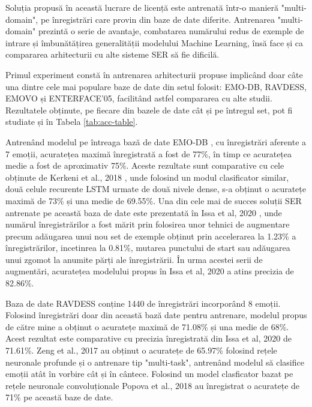 \documentclass[a4paper,12pt]{book}
\begin{document}
		 Soluția propusă în această lucrare de licență este antrenată într-o manieră "multi-domain", pe înregistrări care provin din baze de date diferite. Antrenarea "multi-domain" prezintă o serie de avantaje, combatarea numărului redus de exemple de intrare și îmbunătățirea generalității modelului Machine Learning, însă face și ca compararea arhitecturii cu alte sisteme SER să fie dificilă. \par
		 Primul experiment constă în antrenarea arhitecturii propuse implicând doar câte una dintre cele mai populare baze de date din setul folosit: EMO-DB, RAVDESS, EMOVO și ENTERFACE'05, facilitând astfel compararea cu alte studii. Rezultatele obținute, pe fiecare din bazele de date cât și pe întregul set, pot fi studiate și în Tabela \ref{tab:acc-table}.
		  \par
		 Antrenând modelul pe întreaga bază de date EMO-DB \cite{emodb}, cu înregistrări aferente a 7 emoții, acuratețea maximă înregistrată a fost de 77\%, în timp ce acuratețea medie a fost de aproximativ 75\%. Aceste rezultate sunt comparative cu cele obținute de Kerkeni et al., 2018 \cite{comp1}, unde folosind un modul clasificator similar, două celule recurente LSTM urmate de două nivele dense, s-a obținut o acuratețe maximă de 73\% și una medie de 69.55\%. Una din cele mai de succes soluții SER antrenate pe această baza de date este prezentată în Issa et al, 2020 \cite{comp2}, unde numărul înregistrărilor a fost mărit prin folosirea unor tehnici de augmentare precum adăugarea unui nou set de exemple obținut prin accelerarea la 1.23\% a înregistrărilor, incetinrea la 0.81\%, mutarea punctului de start sau adăugarea unui zgomot la anumite părți ale înregistrării. În urma acestei serii de augmentări, acuratețea modelului propus în Issa et al, 2020 \cite{comp2} a atins precizia de 82.86\%.\par
		 Baza de date RAVDESS \cite{ravdess} conține 1440 de înregistrări incorporând 8 emoții. Folosind înregistrări doar din această bază date pentru antrenare, modelul propus de către mine a obținut o acuratețe maximă de 71.08\% și una medie de 68\%. Acest rezultat este comparative cu precizia înregistrată din Issa et al, 2020 \cite{comp2} de 71.61\%. Zeng et al., 2017 \cite{comp3} au obținut o acuratețe de 65.97\% folosind rețele neuronale profunde și o antrenare tip "multi-task", antrenând modelul să clasifice emoții atât în vorbire cât și în cântece. Folosind un model clasficator bazat pe rețele neuronale convoluționale Popova et al., 2018 \cite{comp4} au înregistrat o acuratețe de 71\% pe această baze de date. \par
\end{document}
